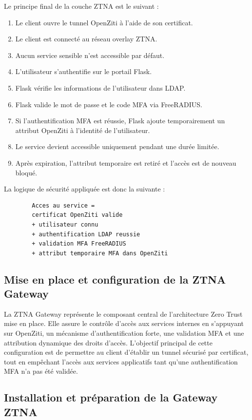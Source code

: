 \documentclass[12pt,a4paper,oneside]{report}
\begin{document}
	Le principe final de la couche ZTNA est le suivant :
	
	\begin{enumerate}
		\item Le client ouvre le tunnel OpenZiti à l'aide de son certificat.
		\item Le client est connecté au réseau overlay ZTNA.
		\item Aucun service sensible n'est accessible par défaut.
		\item L'utilisateur s'authentifie sur le portail Flask.
		\item Flask vérifie les informations de l'utilisateur dans LDAP.
		\item Flask valide le mot de passe et le code MFA via FreeRADIUS.
		\item Si l'authentification MFA est réussie, Flask ajoute temporairement un attribut OpenZiti à l'identité de l'utilisateur.
		\item Le service devient accessible uniquement pendant une durée limitée.
		\item Après expiration, l'attribut temporaire est retiré et l'accès est de nouveau bloqué.
	\end{enumerate}
	
	La logique de sécurité appliquée est donc la suivante :
	
	\begin{lstlisting}
		Acces au service =
		certificat OpenZiti valide
		+ utilisateur connu
		+ authentification LDAP reussie
		+ validation MFA FreeRADIUS
		+ attribut temporaire MFA dans OpenZiti
	\end{lstlisting}
	
	\subsection{Mise en place et configuration de la ZTNA Gateway}
	
	La ZTNA Gateway représente le composant central de l'architecture Zero Trust mise en place. Elle assure le contrôle d'accès aux services internes en s'appuyant sur OpenZiti, un mécanisme d'authentification forte, une validation MFA et une attribution dynamique des droits d'accès. L'objectif principal de cette configuration est de permettre au client d'établir un tunnel sécurisé par certificat, tout en empêchant l'accès aux services applicatifs tant qu'une authentification MFA n'a pas été validée.
	
	\subsection{Installation et préparation de la Gateway ZTNA}
	
\end{document}

